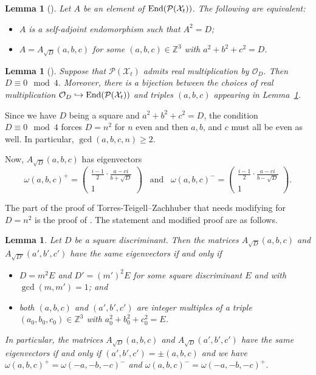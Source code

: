 \documentclass[a4paper,11pt]{amsart}
\numberwithin{equation}{section}
\numberwithin{figure}{section}
\numberwithin{table}{section}
\newtheorem{lemma}[theorem]{Lemma}
\newcommand{\Z}{\mathbb{Z}}
\DeclareMathOperator{\End}{{\rm{End}}}
\begin{document}
\begin{lemma}[{\cite[Lemma 5.2]{TTZ18}}]\label{lem:TTZ1}
    Let $A$ be an element of $\End(\mathcal{P}(\mathcal{X}_{t}))$. The following are equivalent:
    \begin{itemize}
        \item[(i)] $A$ is a self-adjoint endomorphism such that $A^2 = D$;
        \item[(ii)] $A = A_{\sqrt{D}}(a,b,c)$ for some $(a,b,c)\in\Z^{3}$ with $a^2+b^2+c^2 = D$.
    \end{itemize}
\end{lemma}

\begin{lemma}[{\cite[Lemma 5.4]{TTZ18}}]\label{lem:TTZ2}
    Suppose that $\mathcal{P}(\mathcal{X}_{t})$ admits real multiplication by $\mathcal{O}_{D}$. Then $D\equiv 0\!\!\mod 4$.
    Moreover, there is a bijection between the choices of real multiplication $\mathcal{O}_{D}\hookrightarrow \End(\mathcal{P}(\mathcal{X}_{t}))$ and triples $(a,b,c)$ appearing in Lemma~\ref{lem:TTZ1}.
\end{lemma}

Since we have $D$ being a square and $a^2+b^2+c^2 = D$, the condition $D \equiv 0 \!\!\mod 4$ forces $D = n^2$ for $n$ even and then $a,b$, and $c$ must all be even as well. In particular, $\gcd(a,b,c,n)\geq 2$.

Now, $A_{\sqrt{D}}(a,b,c)$ has eigenvectors
\[\omega(a,b,c)^{+} = \begin{pmatrix}
    \frac{i-1}{2}\cdot\frac{a-ci}{b+\sqrt{D}} \\
    1
\end{pmatrix}\,\,\,\,\,\text{and}\,\,\,\,\,\omega(a,b,c)^{-} = \begin{pmatrix}
    \frac{i-1}{2}\cdot\frac{a-ci}{b-\sqrt{D}} \\
    1
\end{pmatrix}.\]

The part of the proof of Torres-Teigell--Zachhuber that needs modifying for $D = n^2$ is the proof of \cite[Lemma 5.3]{TTZ18}. The statement and modified proof are as follows.

\begin{lemma}\label{lem:TTZ3}
    Let $D$ be a square discriminant. Then the matrices $A_{\sqrt{D}}(a,b,c)$ and $A_{\sqrt{D'}}(a',b',c')$ have the same eigenvectors if and only if
    \begin{itemize}
        \item[(i)] $D = m^2E$ and $D' = (m')^2E$ for some square discriminant $E$ and with $\gcd(m,m') = 1$; and 
        \item[(ii)] both $(a,b,c)$ and $(a',b',c')$ are integer multiples of a triple $(a_0,b_0,c_0)\in\Z^{3}$ with $a_0^{2}+b_0^{2}+c_0^{2} = E$.
    \end{itemize}
    In particular, the matrices $A_{\sqrt{D}}(a,b,c)$ and $A_{\sqrt{D}}(a',b',c')$ have the same eigenvectors if and only if $(a',b',c') = \pm(a,b,c)$ and we have $\omega(a,b,c)^{+} = \omega(-a,-b,-c)^{-}$ and $\omega(a,b,c)^{-} = \omega(-a,-b,-c)^{+}$.
\end{lemma}
\end{document}
